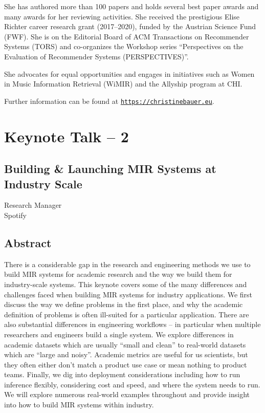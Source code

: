 She has authored more than 100 papers and holds several best paper awards and many awards for her reviewing activities. She received the prestigious Elise Richter career research grant (2017–2020), funded by the Austrian Science Fund (FWF). She is on the Editorial Board of ACM Transactions on Recommender Systems (TORS) and co-organizes the Workshop series ``Perspectives on the Evaluation of Recommender Systems (PERSPECTIVES)''.

She advocates for equal opportunities and engages in initiatives such as Women in Music Information Retrieval (WiMIR) and the Allyship program at CHI.

Further information can be found at \href{https://christinebauer.eu}{\nolinkurl{https://christinebauer.eu}}.

\clearpage


{}
\section*{Keynote Talk -- 2}
\subsection*{Building \& Launching MIR Systems at Industry Scale}

Research Manager\\
Spotify

\subsection*{Abstract}
There is a considerable gap in the research and engineering methods we use to build MIR systems for academic research and the way we build them for industry-scale systems. This keynote covers some of the many differences and challenges faced when building MIR systems for industry applications. We first discuss the way we define problems in the first place, and why the academic definition of problems is often ill-suited for a particular application. There are also substantial differences in engineering workflows – in particular when multiple researchers and engineers build a single system. We explore differences in academic datasets which are usually ``small and clean'' to real-world datasets which are ``large and noisy''. Academic metrics are useful for us scientists, but they often either don't match a product use case or mean nothing to product teams. Finally, we dig into deployment considerations including how to run inference flexibly, considering cost and speed, and where the system needs to run. We will explore numerous real-world examples throughout and provide insight into how to build MIR systems within industry.

